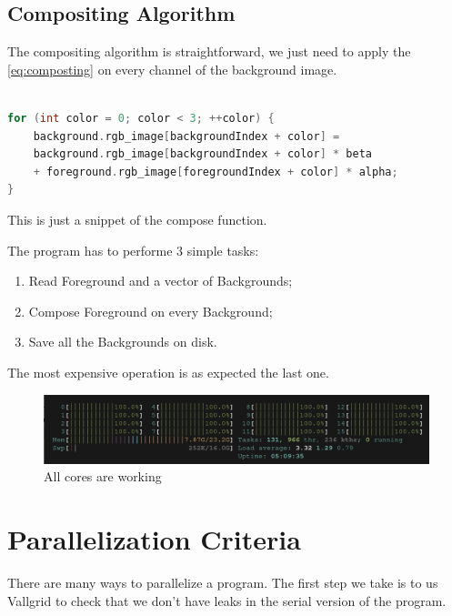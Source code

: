 \documentclass[10pt,twocolumn,letterpaper,english]{article}
\begin{document}
\subsection{Compositing Algorithm}

The compositing algorithm is straightforward, we just need to apply the \ref{eq:composting} on every channel of the background image.
\begin{lstlisting}[style=compactcode, language=C]

for (int color = 0; color < 3; ++color) {
	background.rgb_image[backgroundIndex + color] =
	background.rgb_image[backgroundIndex + color] * beta
	+ foreground.rgb_image[foregroundIndex + color] * alpha;
}

\end{lstlisting}

This is just a snippet of the compose function.

The program has to performe 3 simple tasks:
\begin{enumerate}
	\item Read Foreground and a vector of Backgrounds;
	\item Compose Foreground on every Background;
	\item Save all the Backgrounds on disk.
\end{enumerate}
The most expensive operation is as expected the last one.

\begin{figure}[htbp]
	\centering
	\includegraphics[width=\textwidth]{Threads.png}
	\caption{All cores are working}
	\label{fig:Cores}
\end{figure}
\section{Parallelization Criteria}
There are many ways to parallelize a program. The first step we take is to us Vallgrid \cite{valgrind} to check that we don't have leaks in the serial version of the program.
\end{document}
